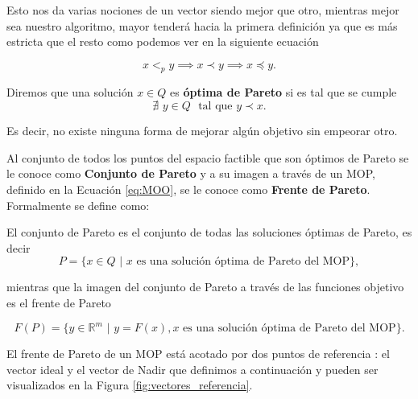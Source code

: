 Esto nos da varias nociones de un vector siendo mejor que otro, mientras mejor sea nuestro algoritmo, mayor tenderá hacia la primera definición ya que es más estricta que el resto como podemos ver en la siguiente ecuación

\begin{equation} \label{eq:contencion_def_pareto}
    x <_p  y \implies x \prec y \implies x \preceq y. \nonumber
\end{equation}

\begin{definition}
Diremos que una solución $x\in Q$ es \textbf{óptima de Pareto} si es tal que se cumple
\begin{equation} \label{eq:opt_pareto}
    \nexists \,\, y\in Q \,\, \text{ tal que } y\prec x. \nonumber
\end{equation}

Es decir, no existe ninguna forma de mejorar algún objetivo sin empeorar otro.
\end{definition}

\begin{definition}
Al conjunto de todos los puntos del espacio factible que son óptimos de Pareto se le conoce como \textbf{Conjunto de Pareto} y a su imagen a través de un MOP, definido en la Ecuación \ref{eq:MOO}, se le conoce como \textbf{Frente de Pareto}. Formalmente se define como:

El conjunto de Pareto es el conjunto de todas las soluciones óptimas de Pareto, es decir
\begin{equation} \label{eq:pareto_set}
    P=\{x\in Q \, \, \big| \, \, x \text{ es una solución óptima de Pareto del MOP}\}, \nonumber
\end{equation}

mientras que la imagen del conjunto de Pareto a través de las funciones objetivo es el frente de Pareto 

\begin{equation} \label{eq:pareto_front}
F(P)=\{y\in \mathbb{R}^m \, \, \big| \, \, y=F(x), x \text{ es una solución óptima de Pareto del MOP}\}.    \nonumber
\end{equation}

\end{definition}

El frente de Pareto de un MOP está acotado por dos puntos de referencia  \cite{tesis_phd_guillermo}: el vector ideal y el vector de Nadir que definimos a continuación y pueden ser visualizados en la Figura \ref{fig:vectores_referencia}.



